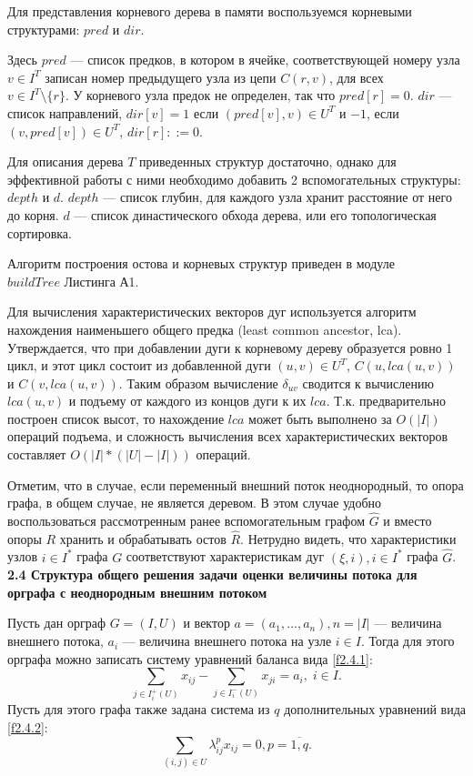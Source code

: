 \documentclass[14pt]{extarticle}%
\begin{document}
Для представления корневого дерева в памяти воспользуемся корневыми структурами: $pred$ и $dir$. 

Здесь $pred$ --- список предков, в котором в ячейке, соответствующей номеру узла $v\in I^T$ записан номер предыдущего узла из цепи $C(r,v)$, для всех \\$v\in I^T\setminus \{r\}$. У корневого узла предок не определен, так что $pred[r]=0$. $dir$ --- список направлений, $dir[v]=1$ если $(pred[v],v)\in U^T$ и $-1$, если $(v,pred[v])\in U^T$, $dir[r]::=0$.

Для описания дерева $T$ приведенных структур достаточно, однако для эффективной работы с ними необходимо добавить 2 вспомогательных структуры: $depth$ и $d$. $depth$ --- список глубин, для каждого узла хранит расстояние от него до корня. $d$ --- список династического обхода дерева, или его топологическая сортировка.

Алгоритм построения остова и корневых структур приведен в модуле \\$buildTree$ Листинга А1.

Для вычисления характеристических векторов дуг используется алгоритм нахождения наименьшего общего предка (least common ancestor, lca). Утверждается, что при добавлении дуги к корневому дереву образуется ровно 1 цикл, и этот цикл состоит из добавленной дуги $(u,v)\in U^T$, $C(u,lca(u,v))$ и $C(v,lca(u,v))$. Таким образом вычисление $\delta_{uv}$ сводится к вычислению $lca(u,v)$ и подъему от каждого из концов дуги к их $lca$. Т.к. предварительно построен список высот, то нахождение $lca$ может быть выполнено за $O(|I|)$ операций подъема, и сложность вычисления всех характеристических векторов составляет $O(|I|*(|U|-|I|))$ операций.

Отметим, что в случае, если переменный внешний поток неоднородный, то опора графа, в общем случае, не является деревом. В этом случае удобно воспользоваться рассмотренным ранее вспомогательным графом $\widehat{G}$ и вместо опоры $R$ хранить и обрабатывать остов $\widehat{R}$. Нетрудно видеть, что характеристики узлов $i\in I^*$ графа $G$ соответствуют характеристикам дуг $(\xi,i), i\in I^*$ графа $\widehat{G}$.\\

\textbf{2.4 Структура общего решения задачи оценки величины потока для орграфа с неоднородным внешним потоком}

Пусть дан орграф $G=(I,U)$ и вектор $a=(a_1, \ldots , a_n), n=|I|$ --- величина внешнего потока, $a_i$ --- величина внешнего потока на узле $i\in I$. Тогда для этого орграфа можно записать систему уравнений баланса вида \eqref{f2.4.1}:
\begin{equation}\label{f2.4.1}
	\sum_{j\in I^+_i(U)} x_{ij}-\sum_{j\in I^-_i(U)}x_{ji}=a_i,\; i\in I.
\end{equation}
Пусть для этого графа также задана система из $q$ дополнительных уравнений вида \eqref{f2.4.2}:
\begin{equation}\label{f2.4.2}
	\sum_{(i,j)\in U}\lambda^{p}_{ij}x_{ij}=0, p=\overline{1,q}.
\end{equation}
\end{document}

